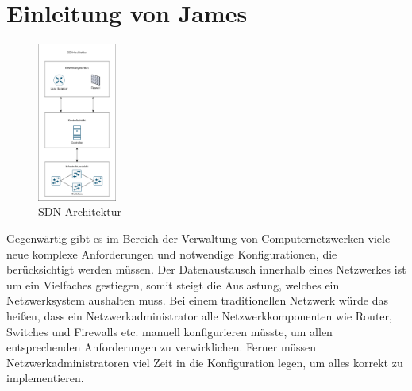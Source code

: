 \documentclass[fontsize=12pt,paper=a4,open=any,parskip=half,
  twoside=false,toc=listof,toc=bibliography,fleqn,leqno,
  captions=nooneline,captions=tableabove,british]{scrbook}
\begin{document}
\section*{Einleitung von James}\label{einl-james}
\begin{figure}
	\vspace{-\baselineskip}
	\centering
	\includegraphics[width=0.23\textwidth]{Bilder/layer1}
	\caption{SDN Architektur}
	\label{layer1}
\end{figure}
Gegenwärtig gibt es im Bereich der Verwaltung von Computernetzwerken viele neue komplexe Anforderungen und notwendige Konfigurationen, die berücksichtigt werden müssen.  Der Datenaustausch innerhalb eines Netzwerkes ist um ein Vielfaches gestiegen, somit steigt die Auslastung, welches ein Netzwerksystem aushalten muss. Bei einem traditionellen Netzwerk würde das heißen, dass ein Netzwerkadministrator alle Netzwerkkomponenten wie Router, Switches und Firewalls etc. manuell konfigurieren müsste, um allen entsprechenden Anforderungen zu verwirklichen. Ferner müssen Netzwerkadministratoren viel Zeit in die Konfiguration legen, um alles korrekt zu implementieren.\par
\end{document}
